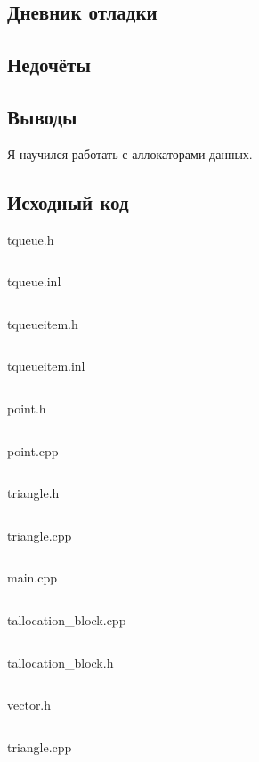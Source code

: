 \documentclass[12pt]{article}
\begin{document}
\subsection*{Дневник отладки}


\subsection*{Недочёты}


\subsection*{Выводы}

Я научился работать с аллокаторами данных.


\vfill

\subsection*{Исходный код}

{\Huge tqueue.h}
\inputminted{C++}{tqueue.h}
    \pagebreak

{\Huge tqueue.inl}
\inputminted{C++}{tqueue.inl}
\pagebreak

{\Huge tqueueitem.h}
\inputminted{C++}{tqueueitem.h}
\pagebreak

{\Huge tqueueitem.inl}
\inputminted{C++}{tqueueitem.inl}
\pagebreak
    
{\Huge point.h}
\inputminted{C++}{point.h}
    \pagebreak

{\Huge point.cpp}
\inputminted{C++}{point.cpp}
    \pagebreak

{\Huge triangle.h}
\inputminted{C++}{triangle.h}
\pagebreak

{\Huge triangle.cpp}
\inputminted{C++}{triangle.cpp}
\pagebreak
    
{\Huge main.cpp}
\inputminted{C++}{main.cpp}
\pagebreak

{\Huge tallocation_block.cpp}
\inputminted{C++}{tallocation_block.cpp}
\pagebreak

{\Huge tallocation_block.h}
\inputminted{C++}{tallocation_block.h}
\pagebreak

{\Huge vector.h}
\inputminted{C++}{vector.h}
\pagebreak

{\Huge triangle.cpp}
\inputminted{C++}{triangle.cpp}
\pagebreak
    
\end{document}

